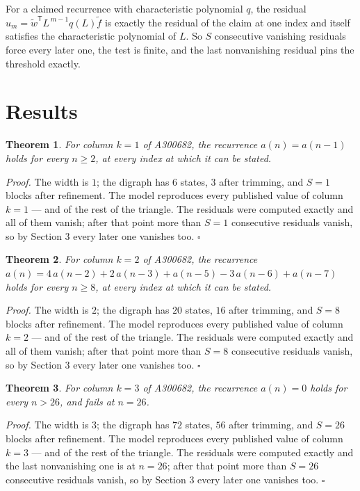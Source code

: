 \documentclass[11pt]{article}
\newtheorem{theorem}{Theorem}
\theoremstyle{definition}
\begin{document}
For a claimed recurrence with characteristic polynomial $q$, the residual $u_m = \tilde w^{\mathsf T}L^{\,m-1}q(L)\tilde f$ is exactly the residual of the claim at one index and itself satisfies the characteristic polynomial of $L$. So $S$ consecutive vanishing residuals force every later one, the test is finite, and the last nonvanishing residual pins the threshold exactly.

\section{Results}

\begin{theorem} For column $k = 1$ of A300682, the recurrence $a(n) = a(n-1)$ holds for every $n \ge 2$, at every index at which it can be stated.\end{theorem}

{\itshape Proof.} The width is $1$; the digraph has $6$ states, $3$ after trimming, and $S = 1$ blocks after refinement. The model reproduces every published value of column $k = 1$ --- and of the rest of the triangle. The residuals were computed exactly and all of them vanish; after that point more than $S = 1$ consecutive residuals vanish, so by Section 3 every later one vanishes too. $\square$

\begin{theorem} For column $k = 2$ of A300682, the recurrence $a(n) = 4\,a(n-2) + 2\,a(n-3) + a(n-5) - 3\,a(n-6) + a(n-7)$ holds for every $n \ge 8$, at every index at which it can be stated.\end{theorem}

{\itshape Proof.} The width is $2$; the digraph has $20$ states, $16$ after trimming, and $S = 8$ blocks after refinement. The model reproduces every published value of column $k = 2$ --- and of the rest of the triangle. The residuals were computed exactly and all of them vanish; after that point more than $S = 8$ consecutive residuals vanish, so by Section 3 every later one vanishes too. $\square$

\begin{theorem} For column $k = 3$ of A300682, the recurrence $a(n) = 0$ holds for every $n > 26$, and fails at $n = 26$.\end{theorem}

{\itshape Proof.} The width is $3$; the digraph has $72$ states, $56$ after trimming, and $S = 26$ blocks after refinement. The model reproduces every published value of column $k = 3$ --- and of the rest of the triangle. The residuals were computed exactly and the last nonvanishing one is at $n = 26$; after that point more than $S = 26$ consecutive residuals vanish, so by Section 3 every later one vanishes too. $\square$
\end{document}
